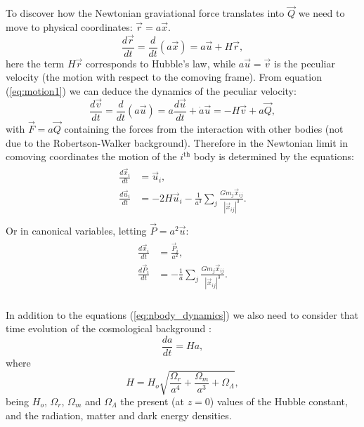 To discover how the Newtonian graviational force translates
into $\vec Q$ we need to move to physical coordinates:
$\vec r = a\vec x$.
\begin{equation}
    \frac{d \vec r}{ dt}
    = \frac{d}{ dt}(a\vec x)
    = a\vec u + H \vec r,
    \label{eq:motion2}
\end{equation}
here the term $H\vec r$ corresponds to Hubble's law,
while $a\vec u = \vec v$ is the peculiar velocity
(the motion with respect to the comoving frame).
From equation (\ref{eq:motion1}) we can deduce
the dynamics of the peculiar velocity:
\begin{equation}
    \frac{d \vec v}{ dt}
    = \frac{d}{ dt}(a\vec u)
    = a \frac{d\vec u}{ dt} + \dot a \vec u
    = -H \vec v + a \vec Q,
\end{equation}
with $\vec F = a\vec Q$ containing the forces
from the interaction with other bodies (not due to the Robertson-Walker background).
Therefore in the Newtonian limit in comoving coordinates 
the motion of the $i^\mathrm{th}$ body is determined by the equations:
\begin{align}
    \begin{split}
    \frac{d\vec x_i}{ dt} &= \vec u_i,\\ 
    \frac{d\vec u_i}{ dt}
    &= -2H\vec u_i - \frac{1}{ a^3} \sum_j \frac{ G m_j \vec x_{ij} }{ |\vec x_{ij}|^3}.\\
    \end{split}
\end{align}
Or in canonical variables, letting $\vec P = a^2 \vec u$:
\begin{align}
    \begin{split}
    \frac{d\vec x_i}{ dt} &= \frac{\vec P_i }{ a^2},\\ 
    \frac{d\vec P_i}{ dt}
    &= - \frac{1}{ a} \sum_j \frac{ G m_j \vec x_{ij} }{ |\vec x_{ij}|^3}.\\
    \end{split}
    \label{eq:nbody_dynamics}
\end{align}

In addition to the equations (\ref{eq:nbody_dynamics}) 
we also need to consider that time evolution of the cosmological background \cite{cosmology}:
\begin{equation}
    \frac{da}{ dt} = H a,
\end{equation}
where
\begin{equation}
    H = H_o \sqrt{ \frac{ \Omega_r }{ a^4} + \frac{ \Omega_m }{ a^3} + \Omega_\Lambda  },
\end{equation}
being $H_o$, $\Omega_r$, $\Omega_m$ and $\Omega_\Lambda$ the present (at $z=0$)
values of the Hubble constant, and the radiation, matter and dark energy
densities.

